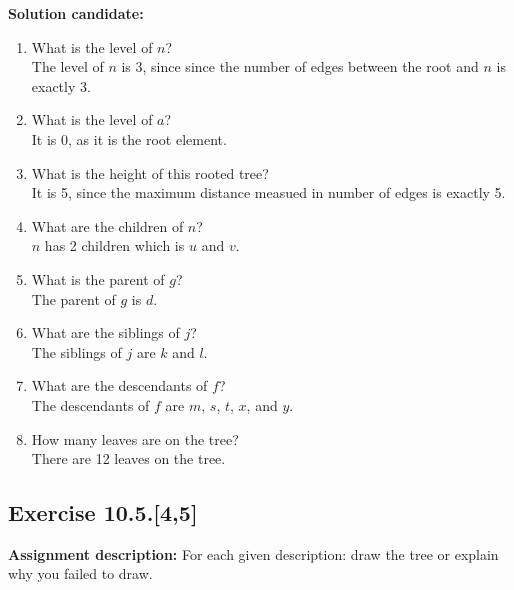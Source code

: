 \documentclass{report}
\newcommand{\assignmentDescription}{\textbf{Assignment description: }}
\newcommand{\solution}{\textbf{Solution candidate: }}
\newcommand{\Exercise}[1]{\subsection{Exercise #1}}
\newcommand{\defaultEnumerateLabel}{\textbf{\alph*.}}
\newcommand{\myItem}[1]{\item #1\\}
\begin{document}
	\solution
	\begin{enumerate}[label=\defaultEnumerateLabel]
		\myItem{What is the level of $n$?}
		
		The level of $n$ is 3, since since the number of edges between the root and $n$ is exactly 3.
		\myItem{What is the level of $a$?}
		
		It is 0, as it is the root element.
		
		\myItem{What is the height of this rooted tree?}
		
		It is 5, since the maximum distance measued in number of edges is exactly 5.
		\myItem{What are the children of $n$?}
		
		$n$ has 2 children which is $u$ and $v$.
		
		\myItem{What is the parent of $g$?}
		
		The parent of $g$ is $d$.
		
		\myItem{What are the siblings of $j$?}
		
		The siblings of $j$ are $k$ and $l$.
		
		\myItem{What are the descendants of $f$?}
		
		The descendants of $f$ are $m$, $s$, $t$, $x$, and $y$.
		\myItem{How many leaves are on the tree?}
		
		There are 12 leaves on the tree.
	\end{enumerate}
	
	\Exercise{10.5.[4,5]}
	\assignmentDescription
	For each given description: draw the tree or explain why you failed to draw.\\
	
\end{document}
